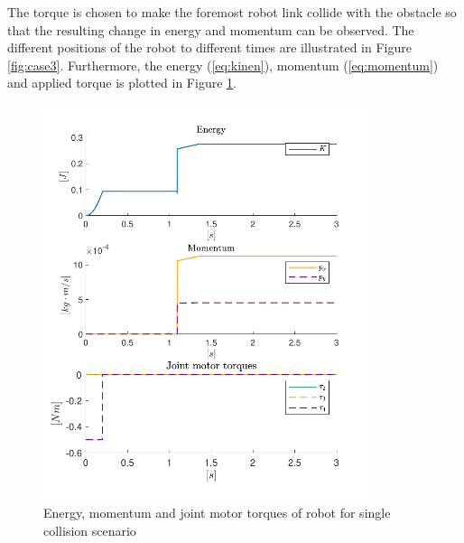 The torque is chosen to make the foremost robot link collide with the obstacle so that the resulting change in energy and momentum can be observed. The different positions of the robot to different times are illustrated in Figure \ref{fig:case3}. Furthermore, the energy (\ref{eq:kinen}), momentum (\ref{eq:momentum}) and applied torque is plotted in Figure \ref{fig:case3-plot}.


\begin{figure}[H]
    \centering
    
    \includegraphics[width=0.85\textwidth]{figures/case-3/energy-momentum.pdf}

    \caption{Energy, momentum and joint motor torques of robot for single collision scenario}
    \label{fig:case3-plot}
\end{figure}


